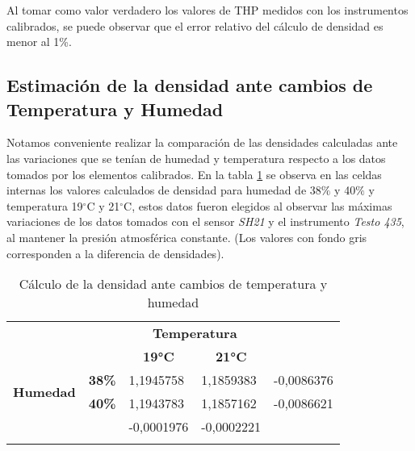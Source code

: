 Al tomar como valor verdadero los valores de THP medidos con los instrumentos calibrados, se puede observar que el error relativo del cálculo de densidad es menor al 1\%.



\subsection{Estimación de la densidad ante cambios de Temperatura y Humedad}
Notamos conveniente realizar la comparación de las densidades calculadas ante las variaciones que se tenían de humedad y temperatura respecto a los datos tomados por los elementos calibrados. En la tabla \ref{densTH} se observa en las celdas internas los valores calculados de densidad para humedad de 38$\%$ y 40$\%$ y temperatura 19$^{\circ}$C y 21$^{\circ}$C, estos datos fueron elegidos al observar las máximas variaciones de los datos tomados con el sensor \textit{SH21} y el instrumento \textit{Testo 435}, al mantener la presión atmosférica constante.
(Los valores con fondo gris corresponden a la diferencia de densidades).

\begin{table}[H]
	\centering
	\begin{tabular}{ll|l|l|l|} 
		\cline{3-4}
		&                                    & \multicolumn{2}{c|}{\textbf{Temperatura}}                                                       & \multicolumn{1}{l}{}                            \\ 
		\cline{3-4}
		&                                    & \multicolumn{1}{c|}{\textbf{19°C}}             & \multicolumn{1}{c|}{\textbf{21°C}}             & \multicolumn{1}{c}{\textbf{}}                   \\ 
		\hline
		\multicolumn{1}{|c|}{\multirow{2}{*}{\textbf{Humedad}}} & \multicolumn{1}{r|}{\textbf{38\%}} & 1,1945758                                      & 1,1859383                                      & {\cellcolor[rgb]{0.816,0.816,0.816}}-0,0086376  \\ 
		\hhline{|~----|}
		\multicolumn{1}{|c|}{}                                  & \multicolumn{1}{r|}{\textbf{40\%}} & 1,1943783                                      & 1,1857162                                      & {\cellcolor[rgb]{0.816,0.816,0.816}}-0,0086621  \\ 
		\hline
		& \multicolumn{1}{c|}{\textbf{}}     & {\cellcolor[rgb]{0.816,0.816,0.816}}-0,0001976 & {\cellcolor[rgb]{0.816,0.816,0.816}}-0,0002221 & \multicolumn{1}{l}{}                            \\
		\hhline{~~--~}
	\end{tabular}
	\caption{Cálculo de la densidad ante cambios de temperatura y humedad}
	\label{densTH}
\end{table}

